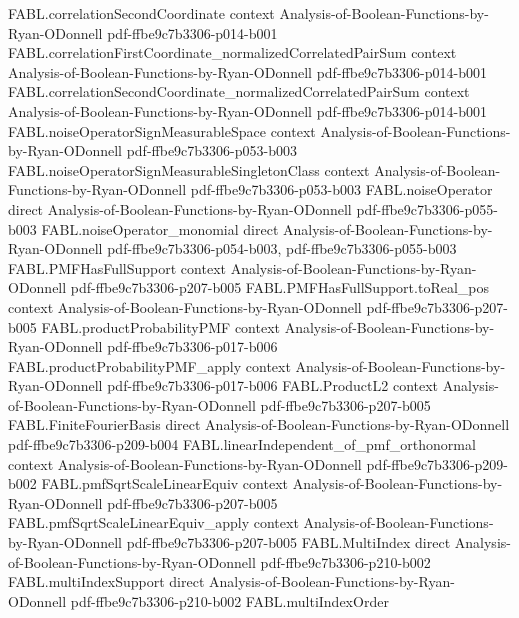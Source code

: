 \begin{theorem}
  {FABL.correlationSecondCoordinate}
  {context}
  {Analysis-of-Boolean-Functions-by-Ryan-ODonnell}
  {pdf-ffbe9c7b3306-p014-b001}
\proofstep
  {FABL.correlationFirstCoordinate_normalizedCorrelatedPairSum}
  {context}
  {Analysis-of-Boolean-Functions-by-Ryan-ODonnell}
  {pdf-ffbe9c7b3306-p014-b001}
\proofstep
  {FABL.correlationSecondCoordinate_normalizedCorrelatedPairSum}
  {context}
  {Analysis-of-Boolean-Functions-by-Ryan-ODonnell}
  {pdf-ffbe9c7b3306-p014-b001}
\proofstep
  {FABL.noiseOperatorSignMeasurableSpace}
  {context}
  {Analysis-of-Boolean-Functions-by-Ryan-ODonnell}
  {pdf-ffbe9c7b3306-p053-b003}
\proofstep
  {FABL.noiseOperatorSignMeasurableSingletonClass}
  {context}
  {Analysis-of-Boolean-Functions-by-Ryan-ODonnell}
  {pdf-ffbe9c7b3306-p053-b003}
\proofstep
  {FABL.noiseOperator}
  {direct}
  {Analysis-of-Boolean-Functions-by-Ryan-ODonnell}
  {pdf-ffbe9c7b3306-p055-b003}
\proofstep
  {FABL.noiseOperator_monomial}
  {direct}
  {Analysis-of-Boolean-Functions-by-Ryan-ODonnell}
  {pdf-ffbe9c7b3306-p054-b003,
    pdf-ffbe9c7b3306-p055-b003}
\proofstep
  {FABL.PMFHasFullSupport}
  {context}
  {Analysis-of-Boolean-Functions-by-Ryan-ODonnell}
  {pdf-ffbe9c7b3306-p207-b005}
\proofstep
  {FABL.PMFHasFullSupport.toReal_pos}
  {context}
  {Analysis-of-Boolean-Functions-by-Ryan-ODonnell}
  {pdf-ffbe9c7b3306-p207-b005}
\proofstep
  {FABL.productProbabilityPMF}
  {context}
  {Analysis-of-Boolean-Functions-by-Ryan-ODonnell}
  {pdf-ffbe9c7b3306-p017-b006}
\proofstep
  {FABL.productProbabilityPMF_apply}
  {context}
  {Analysis-of-Boolean-Functions-by-Ryan-ODonnell}
  {pdf-ffbe9c7b3306-p017-b006}
\proofstep
  {FABL.ProductL2}
  {context}
  {Analysis-of-Boolean-Functions-by-Ryan-ODonnell}
  {pdf-ffbe9c7b3306-p207-b005}
\proofstep
  {FABL.FiniteFourierBasis}
  {direct}
  {Analysis-of-Boolean-Functions-by-Ryan-ODonnell}
  {pdf-ffbe9c7b3306-p209-b004}
\proofstep
  {FABL.linearIndependent_of_pmf_orthonormal}
  {context}
  {Analysis-of-Boolean-Functions-by-Ryan-ODonnell}
  {pdf-ffbe9c7b3306-p209-b002}
\proofstep
  {FABL.pmfSqrtScaleLinearEquiv}
  {context}
  {Analysis-of-Boolean-Functions-by-Ryan-ODonnell}
  {pdf-ffbe9c7b3306-p207-b005}
\proofstep
  {FABL.pmfSqrtScaleLinearEquiv_apply}
  {context}
  {Analysis-of-Boolean-Functions-by-Ryan-ODonnell}
  {pdf-ffbe9c7b3306-p207-b005}
\proofstep
  {FABL.MultiIndex}
  {direct}
  {Analysis-of-Boolean-Functions-by-Ryan-ODonnell}
  {pdf-ffbe9c7b3306-p210-b002}
\proofstep
  {FABL.multiIndexSupport}
  {direct}
  {Analysis-of-Boolean-Functions-by-Ryan-ODonnell}
  {pdf-ffbe9c7b3306-p210-b002}
\proofstep
  {FABL.multiIndexOrder}

\end{theorem}
